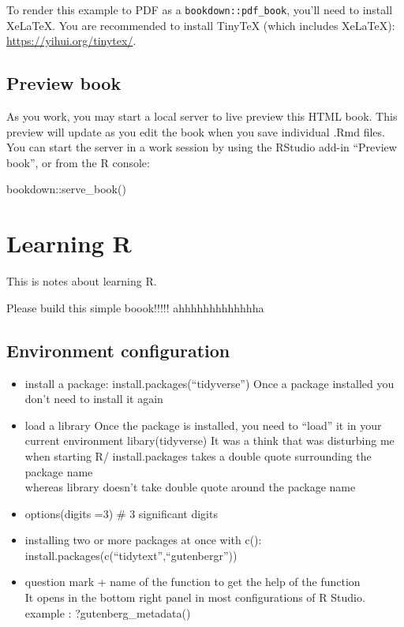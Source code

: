 \documentclass[
]{book}
\newenvironment{Shaded}{\begin{snugshade}}{\end{snugshade}}
\newcommand{\FunctionTok}[1]{\textcolor[rgb]{0.00,0.00,0.00}{#1}}
\newcommand{\NormalTok}[1]{#1}
\newcommand{\SpecialCharTok}[1]{\textcolor[rgb]{0.00,0.00,0.00}{#1}}
\begin{document}
To render this example to PDF as a \texttt{bookdown::pdf\_book}, you'll need to install XeLaTeX. You are recommended to install TinyTeX (which includes XeLaTeX): \url{https://yihui.org/tinytex/}.

\hypertarget{preview-book}{%
\section{Preview book}\label{preview-book}}

As you work, you may start a local server to live preview this HTML book. This preview will update as you edit the book when you save individual .Rmd files. You can start the server in a work session by using the RStudio add-in ``Preview book'', or from the R console:

\begin{Shaded}
\begin{Highlighting}[]
\NormalTok{bookdown}\SpecialCharTok{::}\FunctionTok{serve\_book}\NormalTok{()}
\end{Highlighting}
\end{Shaded}

\hypertarget{learning-r}{%
\chapter{Learning R}\label{learning-r}}

This is notes about learning R.

Please build this simple boook!!!!! ahhhhhhhhhhhhha

\hypertarget{environment-configuration}{%
\section{Environment configuration}\label{environment-configuration}}

\begin{itemize}
\item
  install a package: install.packages(``tidyverse'')
  Once a package installed you don't need to install it again
\item
  load a library
  Once the package is installed, you need to ``load'' it in your current environment
  libary(tidyverse)
  It was a think that was disturbing me when starting R/
  install.packages takes a double quote surrounding the package name\\
  whereas library doesn't take double quote around the package name
\item
  options(digits =3) \# 3 significant digits
\item
  installing two or more packages at once with c():\\
  install.packages(c(``tidytext'',``gutenbergr''))
\item
  question mark + name of the function to get the help of the function\\
  It opens in the bottom right panel in most configurations of R Studio.
  example : ?gutenberg\_metadata()
\end{itemize}
\end{document}
